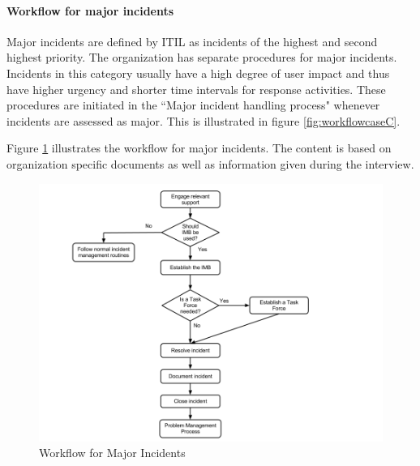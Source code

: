 \paragraph{Workflow for major incidents}
Major incidents are defined by ITIL as incidents of the highest and second highest priority. The organization has separate procedures for major incidents. Incidents in this category usually have a high degree of user impact and thus have higher urgency and shorter time intervals for response activities. These procedures are initiated in the ``Major incident handling process" whenever incidents are assessed as major. This is illustrated in figure \ref{fig:workflowcaseC}.  

Figure \ref{fig:workflowcaseCmajor} illustrates the workflow for major incidents. The content is based on organization specific documents as well as information given during the interview.

\begin{figure}[H]
\hspace{-1.1cm}\includegraphics[scale=0.53]{WorkflowcaseCMAJOR.png}
\caption[Workflow for Major Incidents, Case C]{Workflow for Major Incidents}
\label{fig:workflowcaseCmajor}
\end{figure}

